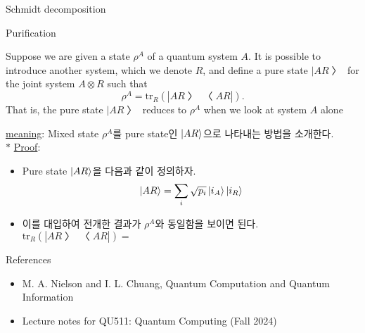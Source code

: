 \documentclass[9pt]{beamer}
\begin{document}
\begin{section}{Schmidt decomposition}
        \begin{frame}{Purification}
            \begin{theorem}[purification]
                Suppose we are given a state $\rho^A$ of a quantum system $A$. It is possible to introduce another system, which we denote $R$, and define a pure state $|AR〉$ for the joint system $A \otimes R$ such that 
                $$\rho^A = \text{tr}_R(|AR〉〈AR|).$$
                That is, the pure state $|AR〉$ reduces to $\rho^A$ when we look at system $A$ alone
            \end{theorem}
            \checkmark \underline{meaning}: Mixed state $\rho^{A}$를 pure state인 $\ket{AR}$으로 나타내는 방법을 소개한다. 
            \\
            $\ast$ \underline{Proof}:
            \begin{itemize}
                \item Pure state $\ket{AR}$을 다음과 같이 정의하자.
                $$ \ket{AR} = \sum_i \sqrt{p_i} \ket{i_A} \ket{i_R}$$
                \item 이를 대입하여 전개한 결과가 $\rho^A$와 동일함을 보이면 된다.
                $$  \text{tr}_R(|AR〉〈AR|) = \qquad \qquad \qquad \qquad \qquad \qquad \qquad \qquad \qquad \qquad \qquad \qquad $$
                \vspace{2cm}
            \end{itemize}
        \end{frame}
    \end{section}

    \begin{frame}{References}
        
        \begin{itemize}
            \item M. A. Nielson and I. L. Chuang, Quantum Computation and Quantum Information
            \item Lecture notes for QU511: Quantum Computing (Fall 2024)
        \end{itemize}
        \vspace{6cm}
    \end{frame}
\end{document}
